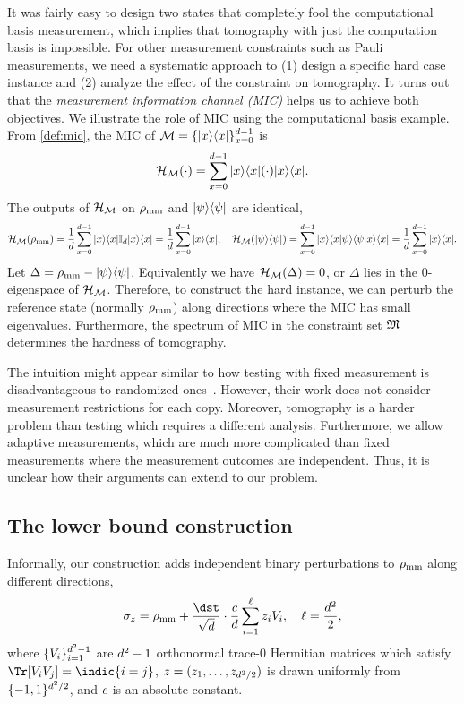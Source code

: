 It was fairly easy to design two states that completely fool the computational basis measurement, which implies that tomography with just the computation basis is impossible.
For other measurement constraints such as Pauli measurements, we need a systematic approach to (1) design a specific hard case instance and (2) analyze the effect of the constraint on tomography. It turns out that the \emph{measurement information channel (MIC)} helps us to achieve both objectives. We illustrate the role of MIC using the computational basis example. From \cref{def:mic}, the MIC of $\mathcal{M}=\{|{x}\rangle\langle{x}|\}_{x=0}^{d-1}$ is
\[
\mathcal{H}_{\mathcal{M}}(\cdot) = \sum_{x=0}^{d-1} |{x}\rangle\langle{x}|(\cdot)|{x}\rangle\langle{x}|.
\]
The outputs of $\mathcal{H}_{\mathcal{M}}$ on ${\rho_{\text{mm}}}$ and $|{\psi}\rangle\langle{\psi}|$ are identical,
\[
\mathcal{H}_{\mathcal{M}}({\rho_{\text{mm}}})=\frac{1}{d}\sum_{x=0}^{d-1} |{x}\rangle\langle{x}|\mathbb{I}_d|{x}\rangle\langle{x}|=\frac{1}{d}\sum_{x=0}^{d-1} |{x}\rangle\langle{x}|,\quad 
\mathcal{H}_{\mathcal{M}}(|{\psi}\rangle\langle{\psi}|)=\sum_{x=0}^{d-1} |{x}\rangle\langle x|\psi\rangle\langle\psi|x\rangle\langle{x}|=\frac{1}{d}\sum_{x=0}^{d-1} |{x}\rangle\langle{x}|.
\]
Let $\Delta={\rho_{\text{mm}}}-|{\psi}\rangle\langle{\psi}|$. Equivalently we have $\mathcal{H}_{\mathcal{M}}(\Delta)=0$, or $\Delta$ lies in the 0-eigenspace of $\mathcal{H}_{\mathcal{M}}$. Therefore, to construct the hard instance, we can perturb the reference state (normally ${\rho_{\text{mm}}}$) along directions where the MIC has small eigenvalues. Furthermore, the spectrum of MIC in the constraint set ${\mathfrak{M}}$ determines the hardness of tomography.

The intuition might appear similar to how testing with fixed measurement is disadvantageous to randomized ones~\cite{liu2024role}. However, their work does not consider measurement restrictions for each copy. Moreover, tomography is a harder problem than testing which requires a different analysis. Furthermore, we allow adaptive measurements, which are much more complicated than fixed measurements where the measurement outcomes are independent. Thus, it is unclear how their arguments can extend to our problem.


\subsection{The lower bound construction} 
Informally, our construction adds independent binary perturbations to ${\rho_{\text{mm}}}$ along different directions,
\begin{equation}
\label{equ:quantum-construction-informal}
    \sigma_z=\qmm + \frac{\dst}{\sqrt{\dims}}\cdot\frac{\cd}{\dims}\sum_{i=1}^{\ell} z_iV_i, \quad\ell=\frac{\dims^2}{2},
\end{equation}
where $\{V_i\}_{i=1}^{d^2-1}$ are $d^2-1$ orthonormal trace-0 Hermitian matrices which satisfy $\Tr[V_iV_j]=\indic{i=j}$, $z=(z_1, \ldots, z_{d^2/2})$ is drawn uniformly from $\{-1, 1\}^{d^2/2}$, and ${c}$ is an absolute constant. 

